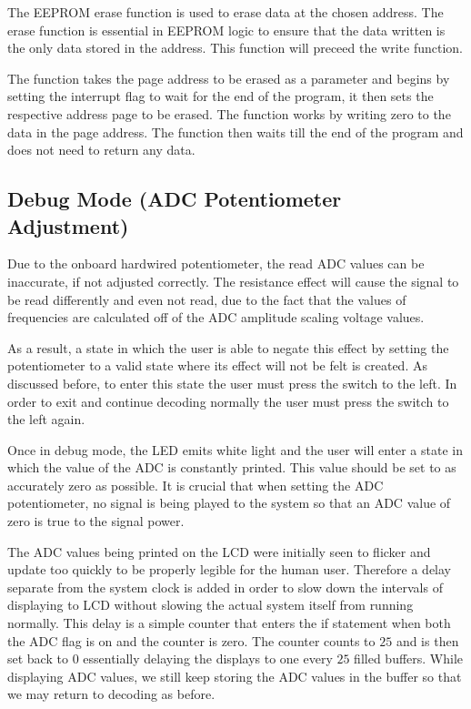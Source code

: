 \documentclass{cce2014-design}
\begin{document}
The EEPROM erase function is used to erase data at the chosen address.
The erase function is essential in EEPROM logic to ensure that the data written is the only data stored in the address.
This function will preceed the write function.

The function takes the page address to be erased as a parameter and begins by setting the interrupt flag to wait for the end of the program, it then sets the respective address page to be erased.
The function works by writing zero to the data in the page address.
The function then waits till the end of the program and does not need to return any data.

\subsection{Debug Mode (ADC Potentiometer Adjustment)}

Due to the onboard hardwired potentiometer, the read ADC values can be inaccurate, if not adjusted correctly.
The resistance effect will cause the signal to be read differently and even not read, due to the fact that the values of frequencies are calculated off of the ADC amplitude scaling voltage values.

As a result, a state in which the user is able to negate this effect by setting the potentiometer to a valid state where its effect will not be felt is created.
As discussed before, to enter this state the user must press the switch to the left.
In order to exit and continue decoding normally the user must press the switch to the left again.

Once in debug mode, the LED emits white light and the user will enter a state in which the value of the ADC is constantly printed.
This value should be set to as accurately zero as possible.
It is crucial that when setting the ADC potentiometer, no signal is being played to the system so that an ADC value of zero is true to the signal power.

The ADC values being printed on the LCD were initially seen to flicker and update too quickly to be properly legible for the human user.
Therefore a delay separate from the system clock is added in order to slow down the intervals of displaying to LCD without slowing the actual system itself from running normally.
This delay is a simple counter that enters the if statement when both the ADC flag is on and the counter is zero.
The counter counts to $25$ and is then set back to $0$ essentially delaying the displays to one every $25$ filled buffers.
While displaying ADC values, we still keep storing the ADC values in the buffer so that we may return to decoding as before.
\end{document}
